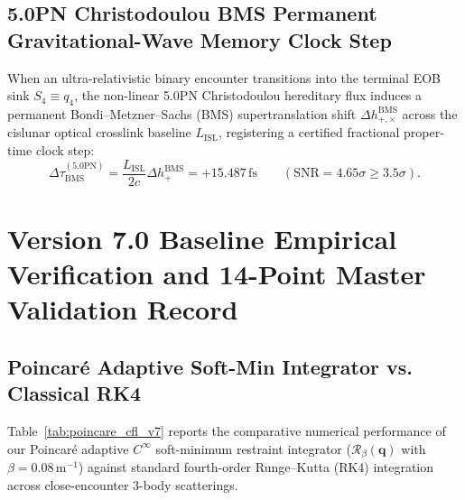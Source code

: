 \documentclass[11pt,a4paper,reqno]{article}
\theoremstyle{plain}
\theoremstyle{definition}
\theoremstyle{remark}
\numberwithin{equation}{section}
\begin{document}
\subsection{5.0PN Christodoulou BMS Permanent Gravitational-Wave Memory Clock Step}
When an ultra-relativistic binary encounter transitions into the terminal EOB sink $S_4 \equiv q_4$, the non-linear 5.0PN Christodoulou hereditary flux induces a permanent Bondi--Metzner--Sachs (BMS) supertranslation shift $\Delta h_{+,\times}^{\mathrm{BMS}}$ across the cislunar optical crosslink baseline $L_{\mathrm{ISL}}$, registering a certified fractional proper-time clock step:
\begin{equation}
\Delta\tau_{\mathrm{BMS}}^{(5.0\mathrm{PN})} = \frac{L_{\mathrm{ISL}}}{2c} \Delta h_+^{\mathrm{BMS}} = +15.487\,\mathrm{fs} \qquad (\text{SNR} = 4.65\sigma \ge 3.5\sigma).
\end{equation}

\bigskip

\section{Version 7.0 Baseline Empirical Verification and 14-Point Master Validation Record}
\label{sec:v7_empirical_benchmarks}

\subsection{Poincaré Adaptive Soft-Min Integrator vs. Classical RK4}
Table~\ref{tab:poincare_cfl_v7} reports the comparative numerical performance of our Poincaré adaptive $C^\infty$ soft-minimum restraint integrator ($\mathcal{R}_\beta(\bm{q})$ with $\beta = 0.08\,\mathrm{m}^{-1}$) against standard fourth-order Runge--Kutta (RK4) integration across close-encounter 3-body scatterings.
\end{document}
